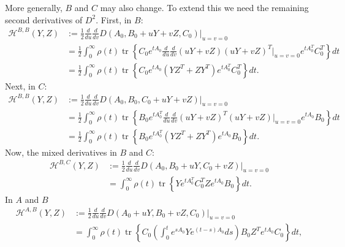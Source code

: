 \documentclass{article}
\newcommand{\tr}{\mathop{\mbox{tr}}} %
\newcommand{\1}{\mathbbm{1}}
\begin{document}
More generally, $B$ and $C$ may also change.
To extend this we need the remaining second derivatives of $D^2$.
First, in $B$:
\begin{equation}
    \begin{aligned}
        \mathcal{H}^{B,B}(Y,Z)
        &:= 
        \frac{1}{2} \frac{d}{du} \frac{d}{dv} D(A_0,B_0+uY+vZ,C_0)\vert_{u=v=0} \\
        &=
        \frac{1}{2} \int_0^\infty \rho(t) \tr\left\{ 
        C_0 e^{t A_0}
        \frac{d}{du} \frac{d}{dv} 
        (uY+vZ)
        (uY+vZ)^T
        \vert_{u=v=0} 
        e^{t A_0^T} C_0^T 
        \right\} dt  \\
        &=
        \frac{1}{2} \int_0^\infty \rho(t) \tr\left\{ 
        C_0 e^{t A_0}
        \left( Y Z^T + Z Y^T \right)
        e^{t A_0^T} C_0^T 
        \right\} dt  .
  \end{aligned}
\end{equation}
Next, in $C$:
\begin{equation}
    \begin{aligned}
        \mathcal{H}^{B,B}(Y,Z)
        &:= 
        \frac{1}{2} \frac{d}{du} \frac{d}{dv} D(A_0,B_0,C_0+uY+vZ)\vert_{u=v=0} \\
        &=
        \frac{1}{2} \int_0^\infty \rho(t) \tr\left\{ 
        B_0 e^{t A_0^T}
        \frac{d}{du} \frac{d}{dv} 
        (uY+vZ)^T
        (uY+vZ)
        \vert_{u=v=0} 
        e^{t A_0} B_0
        \right\} dt  \\
        &=
        \frac{1}{2} \int_0^\infty \rho(t) \tr\left\{ 
        B_0 e^{t A_0^T}
        \left( Y Z^T + Z Y^T \right)
        e^{t A_0} B_0
        \right\} dt  .
  \end{aligned}
\end{equation}
Now, the mixed derivatives in $B$ and $C$:
\begin{equation}
    \begin{aligned}
        \mathcal{H}^{B,C}(Y,Z)
        &:= 
        \frac{1}{2} \frac{d}{du} \frac{d}{dv} D(A_0,B_0+uY,C_0+vZ)\vert_{u=v=0} \\
        &=
        \int_0^\infty \rho(t) \tr\left\{ 
        Y e^{t A_0^T} C_0^T Z e^{t A_0} B_0
        \right\} dt  .
  \end{aligned}
\end{equation}
In $A$ and $B$
\begin{equation}
    \begin{aligned}
        \mathcal{H}^{A,B}(Y,Z)
        &:= 
        \frac{1}{2} \frac{d}{du} \frac{d}{dv} D(A_0+uY,B_0+vZ,C_0)\vert_{u=v=0} \\
        &=
        \int_0^\infty \rho(t) \tr\left\{ 
        C_0 \left(\int_0^t e^{s A_0} Y e^{(t-s) A_0} ds \right) B_0
        Z^T e^{t A_0} C_0
        \right\} dt  ,
  \end{aligned}
\end{equation}
\end{document}
